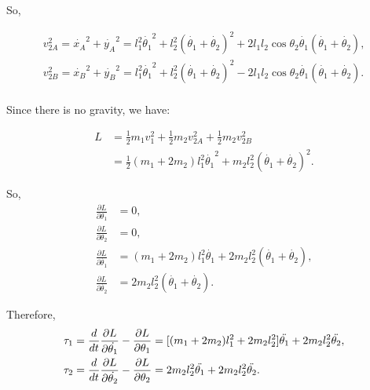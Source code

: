 \documentclass[
  course = {{16-811 Math Fundamentals for Robotics}},
  quartile = {{1}},
  assignment = 5,
  name = {{Kangle Deng}},
  email = {{kangled@andrew.cmu.edu}},
  firstexercise = 1
]{aga-homework}
\begin{document}
So,

\begin{equation*}
    \begin{aligned}
     v_{2A}^2 = \Dot{x_A}^2 + \Dot{y_A}^2 = l_1^2\Dot{\theta_1}^2 + l_2^2(\Dot{\theta_1}+\Dot{\theta_2})^2 + 2l_1l_2\cos\theta_2\Dot{\theta_1}(\Dot{\theta_1}+\Dot{\theta_2}), \\
     v_{2B}^2 = \Dot{x_B}^2 + \Dot{y_B}^2 = l_1^2\Dot{\theta_1}^2 + l_2^2(\Dot{\theta_1}+\Dot{\theta_2})^2 - 2l_1l_2\cos\theta_2\Dot{\theta_1}(\Dot{\theta_1}+\Dot{\theta_2}). \\
    \end{aligned}
\end{equation*}

Since there is no gravity, we have:

\begin{equation*}
\begin{aligned}
    L & = \frac{1}{2}m_1v_1^2 + \frac{1}{2}m_2v_{2A}^2 + \frac{1}{2}m_2v_{2B}^2 \\
    & = \frac{1}{2}(m_1 + 2m_2)l_1^2\Dot{\theta_1}^2 + m_2l_2^2(\Dot{\theta_1}+\Dot{\theta_2})^2.
\end{aligned}
\end{equation*}

So,
\begin{equation*}
    \begin{aligned}
        \frac{\partial L}{\partial \theta_1} & = 0,\\
        \frac{\partial L}{\partial \theta_2} & = 0, \\
        \frac{\partial L}{\partial \Dot{\theta_1}} & = (m_1 + 2m_2)l_1^2\Dot{\theta_1} + 2m_2l_2^2(\Dot{\theta_1}+\Dot{\theta_2}), \\
        \frac{\partial L}{\partial \Dot{\theta_2}} & = 2m_2l_2^2(\Dot{\theta_1}+\Dot{\theta_2}).
    \end{aligned}
\end{equation*}

Therefore,
\begin{equation*}
    \begin{aligned}
        \tau_1 & = \frac{d}{dt}\frac{\partial L}{\partial \Dot{\theta_1}} - \frac{\partial L}{\partial \theta_1} = [(m_1+2m_2)l_1^2+2m_2l_2^2]\Ddot{\theta_1} + 2m_2l_2^2\Ddot{\theta_2}, \\
        \tau_2 & = \frac{d}{dt}\frac{\partial L}{\partial \Dot{\theta_2}} - \frac{\partial L}{\partial \theta_2} = 2m_2l_2^2\Ddot{\theta_1} + 2m_2l_2^2\Ddot{\theta_2}.
    \end{aligned}
\end{equation*}
\end{document}
